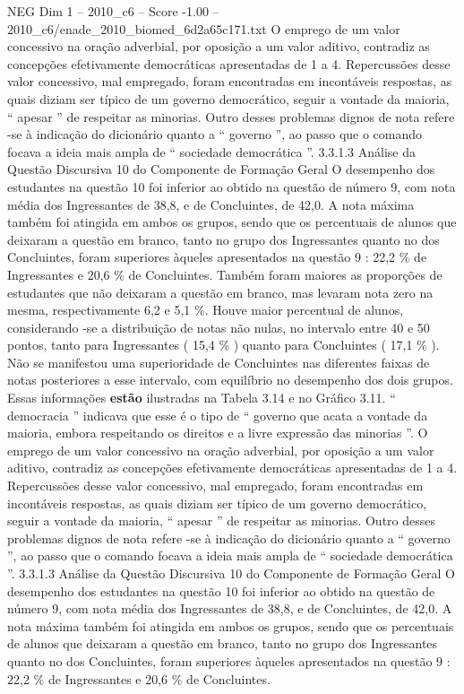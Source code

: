 \begin{textsample}{NEG Dim 1 – 2010\_c6 – Score -1.00 – 2010\_c6/enade\_2010\_biomed\_6d2a65c171.txt}
O emprego de um valor concessivo na oração adverbial, por oposição a um valor aditivo, contradiz as concepções efetivamente democráticas apresentadas de 1 a 4.
Repercussões desse valor concessivo, mal empregado, foram encontradas em incontáveis respostas, as quais diziam ser típico de um governo democrático, seguir a vontade da maioria, “ apesar ” de respeitar as minorias.
Outro desses problemas dignos de nota refere -se à indicação do dicionário quanto a “ governo ”, ao passo que o comando focava a ideia mais ampla de “ sociedade democrática ”. 3.3.1.3 Análise da Questão Discursiva 10 do Componente de Formação Geral O desempenho dos estudantes na questão 10 foi inferior ao obtido na questão de número 9, com nota média dos Ingressantes de 38,8, e de Concluintes, de 42,0.
A nota máxima também foi atingida em ambos os grupos, sendo que os percentuais de alunos que deixaram a questão em branco, tanto no grupo dos Ingressantes quanto no dos Concluintes, foram superiores àqueles apresentados na questão 9 : 22,2 \% de Ingressantes e 20,6 \% de Concluintes.
Também foram maiores as proporções de estudantes que não deixaram a questão em branco, mas levaram nota zero na mesma, respectivamente 6,2 e 5,1 \%.
Houve maior percentual de alunos, considerando -se a distribuição de notas não nulas, no intervalo entre 40 e 50 pontos, tanto para Ingressantes ( 15,4 \% ) quanto para Concluintes ( 17,1 \% ).
Não se manifestou uma superioridade de Concluintes nas diferentes faixas de notas posteriores a esse intervalo, com equilíbrio no desempenho dos dois grupos.
Essas informações \textbf{estão} ilustradas na Tabela 3.14 e no Gráfico 3.11. “ democracia ” indicava que esse é o tipo de “ governo que acata a vontade da maioria, embora respeitando os direitos e a livre expressão das minorias ”.
O emprego de um valor concessivo na oração adverbial, por oposição a um valor aditivo, contradiz as concepções efetivamente democráticas apresentadas de 1 a 4.
Repercussões desse valor concessivo, mal empregado, foram encontradas em incontáveis respostas, as quais diziam ser típico de um governo democrático, seguir a vontade da maioria, “ apesar ” de respeitar as minorias.
Outro desses problemas dignos de nota refere -se à indicação do dicionário quanto a “ governo ”, ao passo que o comando focava a ideia mais ampla de “ sociedade democrática ”. 3.3.1.3 Análise da Questão Discursiva 10 do Componente de Formação Geral O desempenho dos estudantes na questão 10 foi inferior ao obtido na questão de número 9, com nota média dos Ingressantes de 38,8, e de Concluintes, de 42,0.
A nota máxima também foi atingida em ambos os grupos, sendo que os percentuais de alunos que deixaram a questão em branco, tanto no grupo dos Ingressantes quanto no dos Concluintes, foram superiores àqueles apresentados na questão 9 : 22,2 \% de Ingressantes e 20,6 \% de Concluintes.

\end{textsample}
